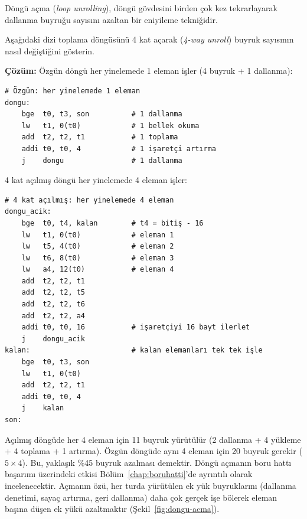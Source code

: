 Döngü açma (\emph{loop unrolling}), döngü gövdesini birden çok kez tekrarlayarak dallanma buyruğu sayısını azaltan bir eniyileme tekniğidir.

\begin{ornek}[4.21]
\label{orn:dongu-acma}
Aşağıdaki dizi toplama döngüsünü 4 kat açarak (\emph{4-way unroll}) buyruk sayısının nasıl değiştiğini gösterin.

\textbf{Çözüm:} Özgün döngü her yinelemede 1 eleman işler (4 buyruk + 1 dallanma):

\begin{lstlisting}[style=riscv]
# Özgün: her yinelemede 1 eleman
dongu:
    bge  t0, t3, son          # 1 dallanma
    lw   t1, 0(t0)            # 1 bellek okuma
    add  t2, t2, t1           # 1 toplama
    addi t0, t0, 4            # 1 işaretçi artırma
    j    dongu                # 1 dallanma
\end{lstlisting}

4 kat açılmış döngü her yinelemede 4 eleman işler:

\begin{lstlisting}[style=riscv]
# 4 kat açılmış: her yinelemede 4 eleman
dongu_acik:
    bge  t0, t4, kalan        # t4 = bitiş - 16
    lw   t1, 0(t0)            # eleman 1
    lw   t5, 4(t0)            # eleman 2
    lw   t6, 8(t0)            # eleman 3
    lw   a4, 12(t0)           # eleman 4
    add  t2, t2, t1
    add  t2, t2, t5
    add  t2, t2, t6
    add  t2, t2, a4
    addi t0, t0, 16           # işaretçiyi 16 bayt ilerlet
    j    dongu_acik
kalan:                        # kalan elemanları tek tek işle
    bge  t0, t3, son
    lw   t1, 0(t0)
    add  t2, t2, t1
    addi t0, t0, 4
    j    kalan
son:
\end{lstlisting}

Açılmış döngüde her 4 eleman için 11 buyruk yürütülür (2 dallanma + 4 yükleme + 4 toplama + 1 artırma). Özgün döngüde aynı 4 eleman için 20 buyruk gerekir ($5 \times 4$). Bu, yaklaşık \%45 buyruk azalması demektir. Döngü açmanın boru hattı başarımı üzerindeki etkisi Bölüm~\ref{chap:boruhatti}'de ayrıntılı olarak incelenecektir. Açmanın özü, her turda yürütülen ek yük buyruklarını (dallanma denetimi, sayaç artırma, geri dallanma) daha çok gerçek işe bölerek eleman başına düşen ek yükü azaltmaktır (Şekil~\ref{fig:dongu-acma}).
\end{ornek}

